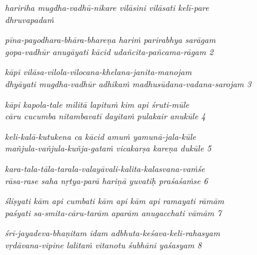 \begin{myquote}
\textit{haririha mugdha-vadhū-nikare vilāsini vilāsati kelī-pare }\\ \textit{dhruvapadaṁ }
\end{myquote}

\begin{myquote}
\textit{pīna-payodhara-bhāra-bhareṇa hariṁ parirabhya sarāgam }\\ \textit{gopa-vadhūr anugāyati kācid udañcita-pañcama-rāgam  2 }
\end{myquote}

\begin{myquote}
\textit{kāpi vilāsa-vilola-vilocana-khelana-janita-manojam }\\ \textit{dhyāyati mugdha-vadhūr adhikaṁ madhusūdana-vadana-sarojam  3 }
\end{myquote}

\begin{myquote}
\textit{kāpi kapola-tale militā lapituṁ kim api śruti-mūle } \\ \textit{cāru cucumba nitambavatī dayitaṁ pulakair anukūle  4 }
\end{myquote}

\begin{myquote}
\textit{keli-kalā-kutukena ca kācid amuṁ yamunā-jala-kūle } \\ \textit{mañjula-vañjula-kuñja-gataṁ vicakarṣa kareṇa dukūle  5 }
\end{myquote}

\begin{myquote}
\textit{kara-tala-tāla-tarala-valayāvali-kalita-kalasvana-vaṁśe } \\ \textit{rāsa-rase saha nṛtya-parā hariṇā yuvatiḥ praśaśaṁse  6 }
\end{myquote}

\begin{myquote}
\textit{śliṣyati kām api cumbati kām api kām api ramayati rāmām } \\ \textit{paśyati sa-smita-cāru-tarām aparām anugacchati vāmām  7 }
\end{myquote}

\begin{myquote}
\textit{śrī-jayadeva-bhaṇitam idam adbhuta-keśava-keli-rahasyam } \\ \textit{vṛdāvana-vipine lalitaṁ vitanotu śubhāni yaśasyam  8 }
\end{myquote}


